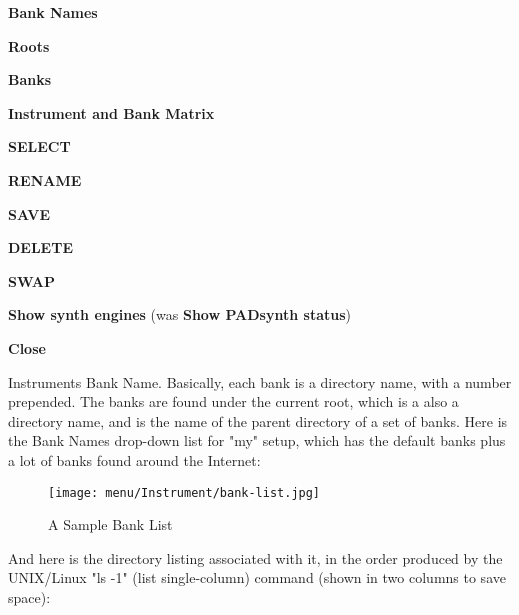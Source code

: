    \begin{enumber}
      \item \textbf{Bank Names}
      \item \textbf{Roots}
      \item \textbf{Banks}
      \item \textbf{Instrument and Bank Matrix}
      \item \textbf{SELECT}
      \item \textbf{RENAME}
      \item \textbf{SAVE}
      \item \textbf{DELETE}
      \item \textbf{SWAP}
      \item \textbf{Show synth engines}
         (was \textbf{Show PADsynth status})
      \item \textbf{Close}
   \end{enumber}

   \setcounter{ItemCounter}{0}      %

   Instruments Bank Name.
   Basically, each bank is a directory name, with a number prepended.
   The banks are found under the current root, which is a also a directory
   name, and is the name of the parent directory of a set of banks.
   Here is the Bank Names drop-down list for "my" setup, which has the
   default banks plus a lot of banks found around the Internet:

\begin{figure}[H]
   \centering 
   \texttt{[image: menu/Instrument/bank-list.jpg]}
   \caption[A Sample Bank List]{A Sample Bank List}
   \label{fig:bank_list}
\end{figure}

   And here is the directory listing associated with it, in the order
   produced by the UNIX/Linux "ls -1" (list single-column) command (shown in
   two columns to save space):

